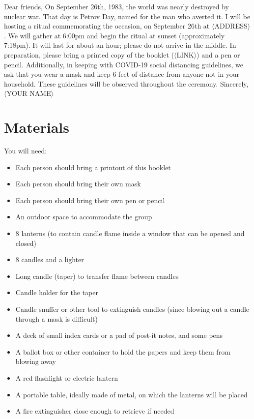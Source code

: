 \documentclass{article}
\begin{document}
\begin{center}
	\parbox{4.5in}{
	Dear friends,\newline\newline
	On September 26th, 1983, the world was nearly destroyed by nuclear war.
	That day is Petrov Day, named for the man who averted it. I will be
	hosting a ritual commemorating the occasion, on September 26th at
	$\langle$ADDRESS$\rangle$. We will gather at 6:00pm and begin the ritual
	at sunset (approximately 7:18pm). It will last for about an hour; please do
	not arrive in the middle.\newline\newline
	In preparation, please bring a printed copy of the booklet
	($\langle$LINK$\rangle$) and a pen or pencil. Additionally, in keeping with
	COVID-19 social distancing guidelines, we ask that you wear a mask and keep
	6 feet of distance from anyone not in your household. These guidelines will
	be observed throughout the ceremony.\newline\newline
	Sincerely,\newline
	$\langle$YOUR NAME$\rangle$}
\end{center}

\section{Materials}
You will need:

\begin{itemize} \itemsep0pt \parskip0pt 
	\item Each person should bring a printout of this booklet
	\item Each person should bring their own mask
	\item Each person should bring their own pen or pencil
	\item An outdoor space to accommodate the group
	\item 8 lanterns (to contain candle flame inside a window that can be opened and closed)
	\item 8 candles and a lighter
	\item Long candle (taper) to transfer flame between candles
	\item Candle holder for the taper
	\item Candle snuffer or other tool to extinguish candles (since blowing out a candle through a mask is difficult)
	\item A deck of small index cards or a pad of post-it notes, and some pens
	\item A ballot box or other container to hold the papers and keep them from blowing away
	\item A red flashlight or electric lantern
	\item A portable table, ideally made of metal, on which the lanterns will be placed
	\item A fire extinguisher close enough to retrieve if needed
\end{itemize}
\end{document}
